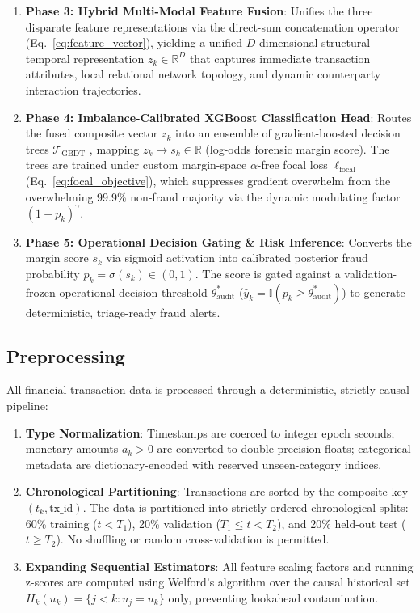 \begin{enumerate}
\begin{itemize}
    \end{itemize}
    \item \textbf{Phase 3: Hybrid Multi-Modal Feature Fusion}: Unifies the three disparate feature representations via the direct-sum concatenation operator (Eq.~\ref{eq:feature_vector}), yielding a unified $D$-dimensional structural-temporal representation $z_k \in \mathbb{R}^D$ that captures immediate transaction attributes, local relational network topology, and dynamic counterparty interaction trajectories.
    \item \textbf{Phase 4: Imbalance-Calibrated XGBoost Classification Head}: Routes the fused composite vector $z_k$ into an ensemble of gradient-boosted decision trees $\mathcal{T}_{\text{GBDT}}$ \cite{chen2016xgboost}, mapping $z_k \to s_k \in \mathbb{R}$ (log-odds forensic margin score). The trees are trained under custom margin-space $\alpha$-free focal loss $\ell_{\text{focal}}$ (Eq.~\ref{eq:focal_objective}), which suppresses gradient overwhelm from the overwhelming 99.9\% non-fraud majority via the dynamic modulating factor $(1 - p_k)^\gamma$.
    \item \textbf{Phase 5: Operational Decision Gating \& Risk Inference}: Converts the margin score $s_k$ via sigmoid activation into calibrated posterior fraud probability $p_k = \sigma(s_k) \in (0, 1)$. The score is gated against a validation-frozen operational decision threshold $\theta_{\text{audit}}^*$ ($\hat{y}_k = \mathbb{I}(p_k \ge \theta_{\text{audit}}^*)$) to generate deterministic, triage-ready fraud alerts.
\end{enumerate}

\subsection{Preprocessing}\label{sec:model_preproc}
All financial transaction data is processed through a deterministic, strictly causal pipeline:
\begin{enumerate}
    \item \textbf{Type Normalization}: Timestamps are coerced to integer epoch seconds; monetary amounts $a_k > 0$ are converted to double-precision floats; categorical metadata are dictionary-encoded with reserved unseen-category indices.
    \item \textbf{Chronological Partitioning}: Transactions are sorted by the composite key $(t_k, \text{tx\_id})$. The data is partitioned into strictly ordered chronological splits: 60\% training ($t < T_1$), 20\% validation ($T_1 \le t < T_2$), and 20\% held-out test ($t \ge T_2$). No shuffling or random cross-validation is permitted.
    \item \textbf{Expanding Sequential Estimators}: All feature scaling factors and running z-scores are computed using Welford's algorithm \cite{welford1962note} over the causal historical set $H_k(u_k) = \{j < k : u_j = u_k\}$ only, preventing lookahead contamination.
\end{enumerate}

